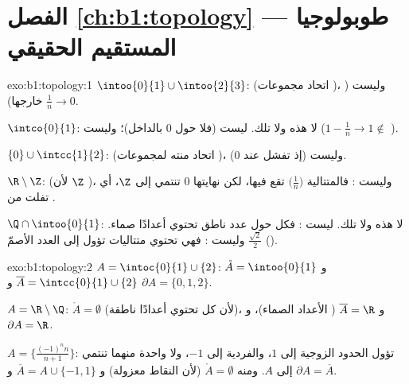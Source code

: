 \section*{الفصل \ref{ch:b1:topology} --- طوبولوجيا المستقيم الحقيقي}

\begin{solution}{exo:b1:topology:1}
$\intoo{0}{1} \cup \intoo{2}{3}$:  (اتحاد مجموعات )، وليست
 ($\frac 1n \to 0$ خارجها).

$\intco{0}{1}$: لا هذه ولا تلك. ليست  (فلا  حول $0$ بالداخل)؛
وليست  ($1 - \frac1n \to 1 \notin$ ).

$\{0\} \cup \intcc{1}{2}$:  (اتحاد منته لمجموعات )، وليست
 (إذ تفشل عند $0$).

$\R \setminus \Z$:  (لأن $\Z$ )، وليست : فالمتتالية
$\bigl(\frac 1n\bigr)$ تقع فيها، لكن نهايتها $0$ تنتمي إلى $\Z$،
أي تفلت من .

$\Q \cap \intoo{0}{1}$: لا هذه ولا تلك. ليست : فكل  حول عدد
ناطق تحتوي أعدادًا صماء. وليست : فهي تحتوي متتاليات
تؤول إلى العدد الأصمّ $\frac{\sqrt 2}{2}$ ().
\end{solution}

\begin{solution}{exo:b1:topology:2}
$A = \intoc{0}{1} \cup \{2\}$: $\mathring A = \intoo{0}{1}$ و
$\overline A = \intcc{0}{1} \cup \{2\}$ و $\partial A = \{0, 1, 2\}$.

$A = \R \setminus \Q$: $\mathring A = \emptyset$ (لأن كل 
تحتوي أعدادًا ناطقة)، و $\overline A = \R$ (
الأعداد الصماء)، و $\partial A = \R$.

$A = \bigl\{\frac{(-1)^n n}{n+1}\bigr\}$: تؤول الحدود الزوجية إلى $1$،
والفردية إلى $-1$، ولا واحدة منهما تنتمي إلى $A$. ومنه $\mathring A =
\emptyset$ (لأن النقاط معزولة) و $\overline A = A \cup \{-1, 1\}$ و
$\partial A = \overline A$.
\end{solution}

